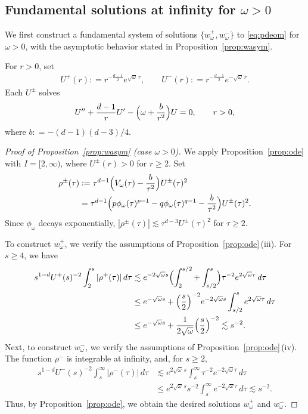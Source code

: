 \documentclass[12pt, a4paper, reqno]{amsart}
\numberwithin{equation}{section}
\theoremstyle{definition}
\theoremstyle{remark}
\newcommand{\ce}{\mathrel{\mathop:}=}
\begin{document}
\subsection{Fundamental solutions at infinity for \texorpdfstring{$\omega>0$}{omega > 0}}

We first construct a fundamental system of solutions
$\{w_\omega^+,w_\omega^-\}$ to \eqref{eq:pdeom} for $\omega>0$,
with the asymptotic behavior stated in Proposition~\ref{prop:wasym}.


For $r>0$, set
\begin{align*}
    U^+(r)
   \ce r^{-\frac{d-1}{2}}e^{\sqrt{\omega}\,r},
   \qquad
    U^-(r)
   \ce r^{-\frac{d-1}{2}}e^{-\sqrt{\omega}\,r}.
\end{align*}
Each $U^\pm$ solves
\begin{align*}
    U''
   +\frac{d-1}{r}U'
   -\Bigl(\omega+\frac{b}{r^2}\Bigr)U
   =0,\qquad r>0,
\end{align*}
where $b\ce -(d-1)(d-3)/4$.

\begin{proof}[Proof of Proposition~\ref{prop:wasym} \textup{(}case $\omega>0$\textup{)}]
We apply Proposition~\ref{prop:ode} with $I=[2,\infty)$, where
$U^\pm(r)>0$ for $r\ge2$. Set
\begin{align*}
    \rho^\pm(\tau)
   &\ce \tau^{d-1}\Bigl(V_\omega(\tau)-\frac{b}{\tau^2}\Bigr)U^\pm(\tau)^2
\\ &=\tau^{d-1}\Bigl(p\phi_\omega(\tau)^{p-1}-q\phi_\omega(\tau)^{q-1}-\frac{b}{\tau^2}\Bigr)U^\pm(\tau)^2.
\end{align*}
Since $\phi_\omega$ decays exponentially,
$|\rho^\pm(\tau)|\lesssim \tau^{d-3}U^\pm(\tau)^2$ for $\tau\ge2$.

To construct $w_\omega^+$, we verify the assumptions of
Proposition~\ref{prop:ode}\,\textup{(iii)}. For $s\ge4$, we have
\begin{align*}
    s^{1-d}U^+(s)^{-2}\int_2^s |\rho^+(\tau)|\,d\tau
   &\lesssim e^{-2\sqrt{\omega}s}
     \Bigl(\int_2^{s/2}+\int_{s/2}^s\Bigr)\tau^{-2}e^{2\sqrt{\omega}\tau}\,d\tau
\\ &\le e^{-\sqrt{\omega}s}
    +\Bigl(\frac{s}{2}\Bigr)^{-2}e^{-2\sqrt{\omega}s}
      \int_{s/2}^s e^{2\sqrt{\omega}\tau}\,d\tau
\\ &\le e^{-\sqrt{\omega}s}
    +\frac{1}{2\sqrt{\omega}}\Bigl(\frac{s}{2}\Bigr)^{-2}
    \lesssim s^{-2}.
\end{align*}
Next, to construct $w_\omega^-$, we verify the assumptions of Proposition~\ref{prop:ode}\,\textup{(iv)}. The function $\rho^-$ is integrable at infinity, and, for $s\ge2$,
\begin{align*}
    s^{1-d}U^-(s)^{-2}\int_s^\infty |\rho^-(\tau)|\,d\tau
   &\lesssim e^{2\sqrt{\omega}\,s}\int_s^\infty \tau^{-2}e^{-2\sqrt{\omega}\tau}\,d\tau
\\ &\le e^{2\sqrt{\omega}\,s}s^{-2}\int_s^\infty e^{-2\sqrt{\omega}\tau}\,d\tau
    \lesssim s^{-2}.
\end{align*}
Thus, by Proposition~\ref{prop:ode}, we obtain the desired solutions $w_\omega^+$ and $w_\omega^-$.
\end{proof}
\end{document}
